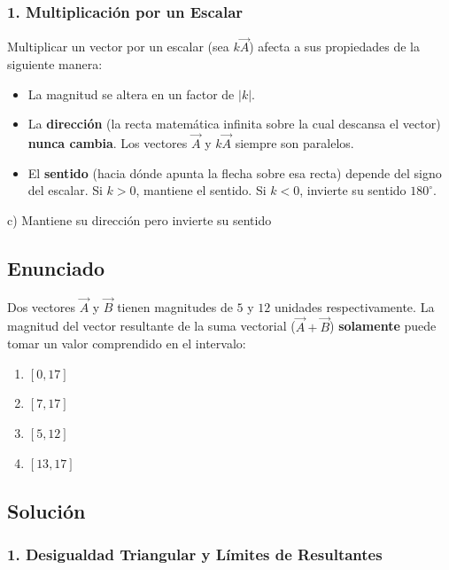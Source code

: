\documentclass[12pt, a4paper]{article}
\begin{document}
\subsubsection*{1. Multiplicación por un Escalar}
Multiplicar un vector por un escalar (sea $k\vec{A}$) afecta a sus propiedades de la siguiente manera:
\begin{itemize}
    \item La magnitud se altera en un factor de $|k|$.
    \item La \textbf{dirección} (la recta matemática infinita sobre la cual descansa el vector) \textbf{nunca cambia}. Los vectores $\vec{A}$ y $k\vec{A}$ siempre son paralelos.
    \item El \textbf{sentido} (hacia dónde apunta la flecha sobre esa recta) depende del signo del escalar. Si $k > 0$, mantiene el sentido. Si $k < 0$, invierte su sentido $180^\circ$.
\end{itemize}

\begin{tcolorbox}[colback=green!5!white, colframe=green!50!black, title=Respuesta Final]
\centering \Large c) Mantiene su dirección pero invierte su sentido
\end{tcolorbox}

\newpage


\subsection*{Enunciado}
Dos vectores $\vec{A}$ y $\vec{B}$ tienen magnitudes de $5$ y $12$ unidades respectivamente. La magnitud del vector resultante de la suma vectorial ($\vec{A} + \vec{B}$) \textbf{solamente} puede tomar un valor comprendido en el intervalo:
\begin{enumerate}[label=\alph*)]
    \item $[0, 17]$
    \item $[7, 17]$
    \item $[5, 12]$
    \item $[13, 17]$
\end{enumerate}

\subsection*{Solución}

\subsubsection*{1. Desigualdad Triangular y Límites de Resultantes}
\end{document}
